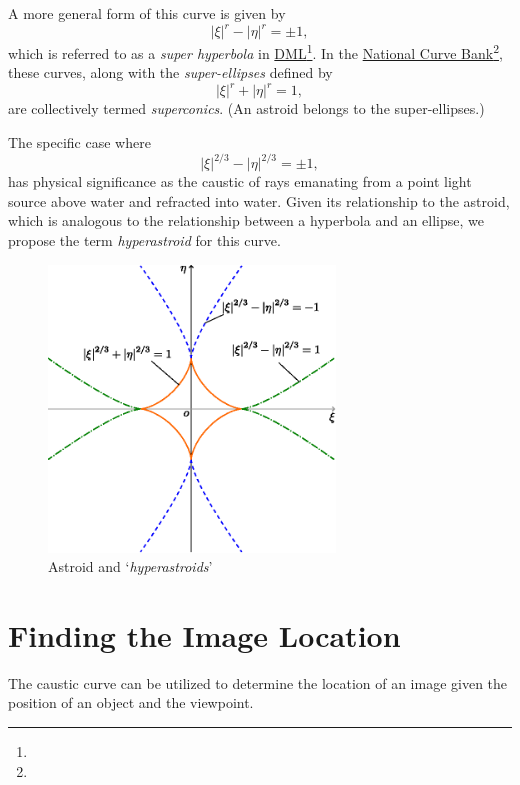 \documentclass[twocolumn]{article}
\begin{document}
A more general form of this curve is given by 
$$ \left| \xi \right|^{r} - \left| \eta \right|^{r} = \pm1, $$
which is referred to as a \emph{super hyperbola} in \href{http://dynamicmathematicslearning.com/super-ellipse.html}{DML}\footnote{}. In the \href{https://old.nationalcurvebank.org/superconicncb/superconicncb.htm}{National Curve Bank}\footnote{}, these curves, along with the \emph{super-ellipses} defined by
$$ \left| \xi \right|^{r} + \left| \eta \right|^{r} = 1, $$
are collectively termed \emph{superconics}. (An astroid belongs to the super-ellipses.) 

The specific case where 
$$ \left| \xi \right|^{2/3} - \left| \eta \right|^{2/3} = \pm1, $$
has physical significance as the caustic of rays emanating from a point light source above water and refracted into water. Given its relationship to the astroid, which is analogous to the relationship between a hyperbola and an ellipse, we propose the term \emph{hyperastroid} for this curve.

\begin{figure}
	\centering
	\includegraphics[width=3in]{figs/g254.eps}
	\caption{Astroid and `\emph{hyperastroids}'}
	\label{fig:hyperastroid}
\end{figure}

\section{Finding the Image Location}

The caustic curve can be utilized to determine the location of an image given the position of an object and the viewpoint.
\end{document}
